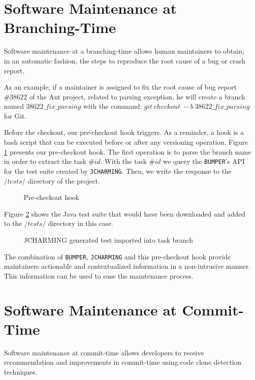 \section{Software Maintenance at Branching-Time}

Software maintenance at a branching-time allows human maintainers to obtain, in an automatic fashion, the steps to reproduce the root cause of a bug or crash report.

As an example, if a maintainer is assigned to fix the root cause of bug report $\#38622$ of the Ant project, related to parsing exception, he will create a branch named $38622\_fix\_parsing$ with the command: $git~checkout~-b~38622\_fix\_parsing$ for Git.

Before the checkout, our pre-checkout hook triggers.
As a reminder, a hook is a bash script that can be executed before or after any versioning operation.
Figure \ref{fig:pre-checkout-hook} presents our pre-checkout hook.
The first operation is to parse the branch name in order to extract the task $\#id$.
With the task $\#id$ we query the {\tt BUMPER}'s API for the test suite created by {\tt JCHARMING}.
Then, we write the response to the $/tests/$ directory of the project.

\begin{figure}
  
  \caption{Pre-checkout hook
  \label{fig:pre-checkout-hook}}
\end{figure}

Figure \ref{fig:jcharming-imported} shows the Java test suite that would have been downloaded and added to the $/tests/$ directory in this case.

\begin{figure}
  
  \caption{JCHARMING generated test imported into task branch
  \label{fig:jcharming-imported}}
\end{figure}

The combination of {\tt BUMPER}, {\tt JCHARMING} and this pre-checkout hook provide maintainers actionable and contextualized information in a non-intrusive manner.
This information can be used to ease the maintenance process.

\section{Software Maintenance at Commit-Time}

Software maintenance at commit-time allows developers to receive recommendation and improvements in commit-time using code clone detection techniques.

